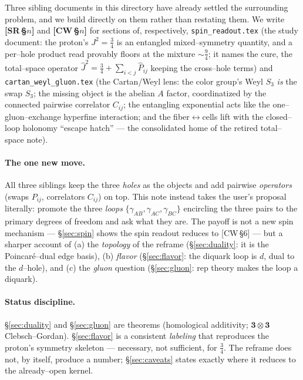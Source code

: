 \documentclass[11pt,oneside]{article}
\newcommand{\code}[1]{\texttt{#1}}
\newcommand{\thr}{\mathbf{3}}
\theoremstyle{plain}
\begin{document}
Three sibling documents in this directory have already settled the surrounding
problem, and we build directly on them rather than restating them. We write
\textbf{[SR\,\S$n$]} and \textbf{[CW\,\S$n$]} for sections of,
respectively, \code{spin\_readout.tex} (the study document: the proton's
$J^2=\tfrac34$ is an entangled mixed--symmetry quantity, and a per--hole product
read provably floors at the mixture $\sim\tfrac94$; it names the cure, the
total--space operator $\hat J^2=\tfrac34+\sum_{i<j}\hat P_{ij}$ keeping the
cross--hole terms) and \code{cartan\_weyl\_gluon.tex} (the Cartan/Weyl lens: the
color group's Weyl $S_3$ \emph{is} the swap $S_3$; the missing object is the
abelian $A$ factor, coordinatized by the connected pairwise correlator $C_{ij}$;
the entangling exponential acts like the one--gluon--exchange hyperfine
interaction; and the fiber$\leftrightarrow$cells lift with the closed--loop
holonomy ``escape hatch'' --- the consolidated home of the retired
total--space note).

\paragraph{The one new move.}
All three siblings keep the three \emph{holes} as the objects and add pairwise
\emph{operators} (swaps $P_{ij}$, correlators $C_{ij}$) on top. This note instead
takes the user's proposal literally: promote the three \emph{loops}
$\{\gamma_{AB},\gamma_{AC},\gamma_{BC}\}$ encircling the three pairs to the
primary degrees of freedom and ask what they are. The payoff is not a new spin
mechanism --- \S\ref{sec:spin} shows the spin readout reduces to [CW\,\S6] ---
but a sharper account of (a) the \emph{topology} of the reframe
(\S\ref{sec:duality}: it is the Poincar\'e--dual edge basis), (b) \emph{flavor}
(\S\ref{sec:flavor}: the diquark loop is $d$, dual to the $d$--hole), and (c) the
\emph{gluon} question (\S\ref{sec:gluon}: rep theory makes the loop a diquark).

\paragraph{Status discipline.}
\S\ref{sec:duality} and \S\ref{sec:gluon} are theorems (homological additivity;
$\thr\otimes\thr$ Clebsch--Gordan). \S\ref{sec:flavor} is a consistent
\emph{labeling} that reproduces the proton's symmetry skeleton --- necessary, not
sufficient, for $\tfrac34$. The reframe does not, by itself, produce a number;
\S\ref{sec:caveats} states exactly where it reduces to the already--open kernel.
\end{document}
